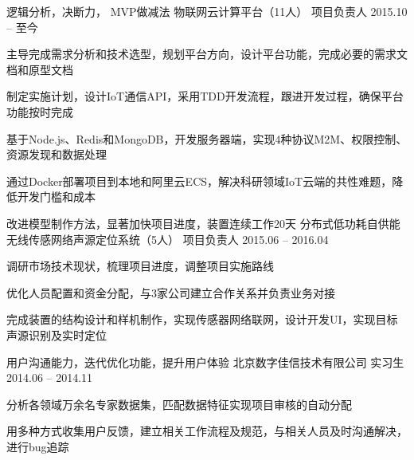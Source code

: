 


\begin{cventries}


\cventry
{逻辑分析，决断力， MVP做减法} %
{物联网云计算平台（11人）} %
{项目负责人} %
{2015.10 -- 至今} %
{ %
\begin{cvitems}
\item {主导完成需求分析和技术选型，规划平台方向，设计平台功能，完成必要的需求文档和原型文档}
\item { 制定实施计划，设计IoT通信API，采用TDD开发流程，跟进开发过程，确保平台功能按时完成}
\item{基于Node.js、Redis和MongoDB，开发服务器端，实现4种协议M2M、权限控制、资源发现和数据处理}
\item{通过Docker部署项目到本地和阿里云ECS，解决科研领域IoT云端的共性难题，降低开发门槛和成本}
\end{cvitems}
}

\cventry
{改进模型制作方法，显著加快项目进度，装置连续工作20天} %
{分布式低功耗自供能无线传感网络声源定位系统（5人）} %
{项目负责人} %
{2015.06 -- 2016.04} %
{ %
\begin{cvitems}
\item {调研市场技术现状，梳理项目进度，调整项目实施路线}
\item {优化人员配置和资金分配，与3家公司建立合作关系并负责业务对接}
\item{完成装置的结构设计和样机制作，实现传感器网络联网，设计开发UI，实现目标声源识别及实时定位}
\end{cvitems} 
}

\cventry
{用户沟通能力，迭代优化功能，提升用户体验} %
{北京数字佳信技术有限公司} %
{实习生} %
{2014.06 -- 2014.11} %
{ %
\begin{cvitems}
\item {分析各领域万余名专家数据集，匹配数据特征实现项目审核的自动分配}
\item {用多种方式收集用户反馈，建立相关工作流程及规范，与相关人员及时沟通解决，进行bug追踪}
\end{cvitems} 
}


\end{cventries}
